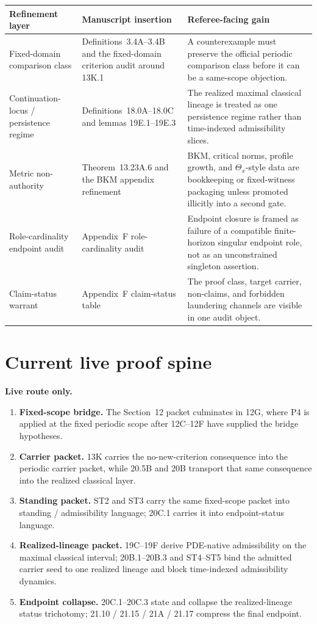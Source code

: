 \documentclass[11pt,letterpaper]{article}
\begin{document}
\begin{longtable}{L{0.25\textwidth}L{0.31\textwidth}L{0.32\textwidth}}
\toprule
\textbf{Refinement layer} & \textbf{Manuscript insertion} & \textbf{Referee-facing gain}\\
\midrule
Fixed-domain comparison class & Definitions~3.4A--3.4B and the fixed-domain criterion audit around 13K.1 & A counterexample must preserve the official periodic comparison class before it can be a same-scope objection.\\
Continuation-locus / persistence regime & Definitions~18.0A--18.0C and lemmas 19E.1--19E.3 & The realized maximal classical lineage is treated as one persistence regime rather than time-indexed admissibility slices.\\
Metric non-authority & Theorem~13.23A.6 and the BKM appendix refinement & BKM, critical norms, profile growth, and \(\Theta_x\)-style data are bookkeeping or fixed-witness packaging unless promoted illicitly into a second gate.\\
Role-cardinality endpoint audit & Appendix~F role-cardinality audit & Endpoint closure is framed as failure of a compatible finite-horizon singular endpoint role, not as an unconstrained singleton assertion.\\
Claim-status warrant & Appendix~F claim-status table & The proof class, target carrier, non-claims, and forbidden laundering channels are visible in one audit object.\\
\bottomrule
\end{longtable}

\section{Current live proof spine}

\begin{spinebox}
\textbf{Live route only.}
\begin{enumerate}[label=(S\arabic*),leftmargin=2.5em]
\item \textbf{Fixed-scope bridge.} The Section~12 packet culminates in 12G, where P4 is applied at the fixed periodic scope after 12C--12F have supplied the bridge hypotheses.
\item \textbf{Carrier packet.} 13K carries the no-new-criterion consequence into the periodic carrier packet, while 20.5B and 20B transport that same consequence into the realized classical layer.
\item \textbf{Standing packet.} ST2 and ST3 carry the same fixed-scope packet into standing / admissibility language; 20C.1 carries it into endpoint-status language.
\item \textbf{Realized-lineage packet.} 19C--19F derive PDE-native admissibility on the maximal classical interval; 20B.1--20B.3 and ST4--ST5 bind the admitted carrier seed to one realized lineage and block time-indexed admissibility dynamics.
\item \textbf{Endpoint collapse.} 20C.1--20C.3 state and collapse the realized-lineage status trichotomy; 21.10 / 21.15 / 21A / 21.17 compress the final endpoint.
\end{enumerate}
\end{spinebox}
\end{document}
